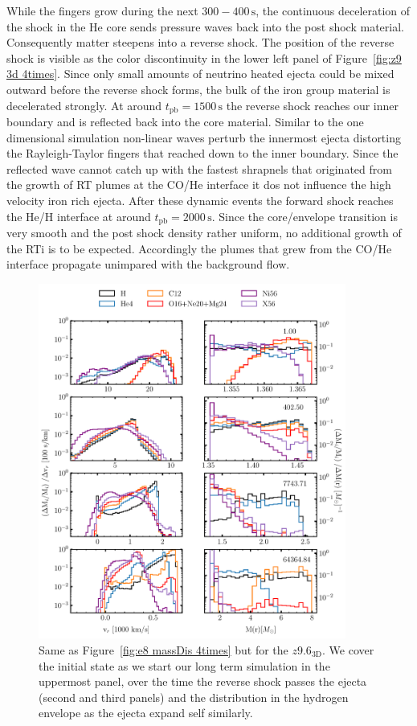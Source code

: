 \documentclass[fleqn,usenatbib]{mnras}
\newcommand{\tpb}{\ensuremath{t_{\text{pb}}}}
\renewcommand{\sec}{\xspace\ensuremath{\text{s}}}
\begin{document}
While the fingers grow during the next $300-400\,\sec$, the continuous deceleration of the shock in the He core sends pressure waves back into the post shock material. Consequently matter steepens into a reverse shock. The position of the reverse shock is visible as the color discontinuity in the lower left panel of Figure~\ref{fig:z9 3d 4times}. Since only small amounts of neutrino heated ejecta could be mixed outward before the reverse shock forms, the bulk of the iron group material is decelerated strongly.
At around $\tpb=1500\,\sec$ the reverse shock reaches our inner boundary and is reflected back into the core material.
Similar to the one dimensional simulation non-linear waves perturb the innermost ejecta distorting the Rayleigh-Taylor fingers that reached down to the inner boundary. Since the reflected wave cannot catch up with the fastest shrapnels that originated from the growth of RT plumes at the CO/He interface it dos not influence the high velocity iron rich ejecta.
After these dynamic events the forward shock reaches the He/H interface at around $\tpb=2000\,\text{s}$. Since the core/envelope transition is very smooth and the post shock density rather uniform, no additional growth of the RTi is to be expected. Accordingly the plumes that grew from the CO/He interface propagate unimpared with the background flow. 
\begin{figure}
 \centering
 \includegraphics[width=0.9\textwidth]{pic/z93_3d_old_massDis_mvr_mas_4times.pdf}
 \caption{Same as Figure~\ref{fig:e8 massDis 4times} but for the $z9.6_{\mathrm{3D}}$. We cover the initial state as we start our long term simulation in the uppermost panel, over the time the reverse shock passes the ejecta (second and third panels) and the distribution in the hydrogen envelope as the ejecta expand self similarly.}
 \label{fig:z9 massDis}
\end{figure}
\end{document}
